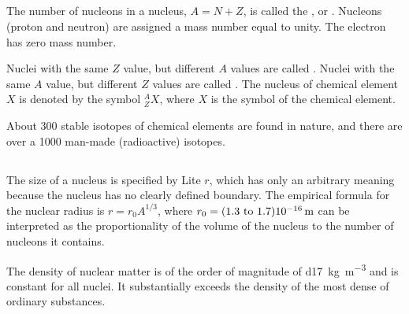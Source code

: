 \subsection{}\label{42.1.3} 

The number of nucleons  in a nucleus, $A = N 
+ Z$, is called the , or . Nucleons (proton and neutron) are assigned a mass number equal to unity. The electron has zero mass number.

Nuclei with the same $Z$ value, but different $A$ values are called . Nuclei with the same $A$ value, but different $Z$ values are called . The nucleus of chemical element $X$ is denoted by the symbol $^{A}_{Z}X$, where $X$ is the symbol of the chemical element.

About 300 stable isotopes of chemical elements are found in
nature, and there are over a 1000 man-made (radioactive)
isotopes.

\subsection{}\label{42.1.4} 

The size of a nucleus is specified by Lite  $r$, which has only an arbitrary meaning because the nucleus has no clearly defined boundary. The empirical formula for the nuclear radius is $r = r_{0}A^{1/3}$, where $r_{0} = (1.3 \text{ to } 1.7) \SI{d-16}{\meter}$ can be interpreted as the proportionality of the volume of the nucleus to the number of nucleons it contains.

The density of nuclear matter is of the order of magnitude of \SI{d17}{\kilo\gram\per\meter\cubed} and is constant for all nuclei. It substantially exceeds the density of the most dense of ordinary substances.

